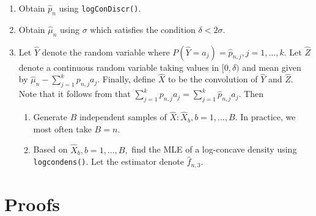 \documentclass[12pt]{article} %
\begin{document}
\begin{enumerate}
    \item Obtain $\widehat p_n$ using \texttt{logConDiscr()}.   %
    \item Obtain $\widehat \mu_n$ using $\sigma$ which satisfies the condition $\delta <  2 \sigma$.
    \item  Let $\widehat Y$ denote the random variable where $P(\widehat Y = a_j) = \widehat p_{n,j}, j=1, \ldots, k.$   Let $\widehat Z$ denote a continuous random variable taking values in $[0, \delta)$ and mean given by $\widehat \mu_n - \sum_{j=1}^k p_{n,j} a_j.$   Finally, define $\widehat X$ to be the convolution of $\widehat Y$ and $\widehat Z.$   Note that it follows from \citet{JankowskiDiscr2013} that $\sum_{j=1}^k p_{n,j} a_j=\sum_{j=1}^k \widehat p_{n,j} a_j.$  Then
\begin{enumerate}
\item Generate $B$ independent samples of $\widehat X: \widehat X_b, b=1, \ldots, B.$   In practice, we most often take $B=n.$
\item Based on $\widehat X_b, b=1, \ldots, B,$ find the MLE of a log-concave density using \texttt{logcondens()}.   Let the estimator denote $\widehat f_{n,3}.$ 
\end{enumerate}
\end{enumerate}







\section{Proofs}\label{appendix:proofs}
\end{document}
